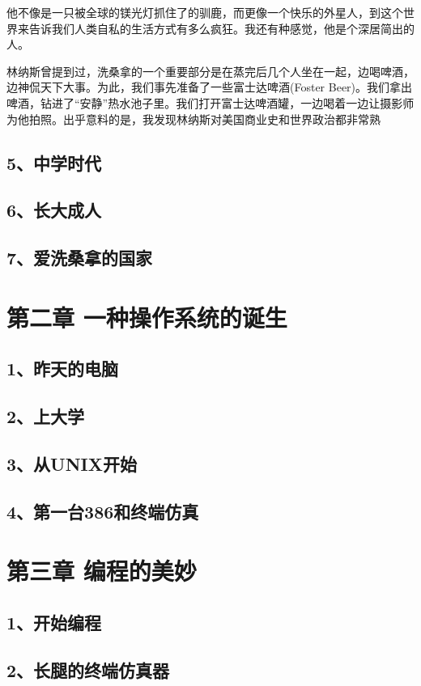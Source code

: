 \documentclass[12pt,UTF8]{ctexbook}
\begin{document}
他不像是一只被全球的镁光灯抓住了的驯鹿，而更像一个快乐的外星人，到这个世界来告诉我们人类自私的生活方式有多么疯狂。我还有种感觉，他是个深居简出的人。

林纳斯曾提到过，洗桑拿的一个重要部分是在蒸完后几个人坐在一起，边喝啤酒，边神侃天下大事。为此，我们事先准备了一些富士达啤酒(Foster Beer)。我们拿出啤酒，钻进了“安静”热水池子里。我们打开富士达啤酒罐，一边喝着一边让摄影师为他拍照。出乎意料的是，我发现林纳斯对美国商业史和世界政治都非常熟

\section{5、中学时代}
\section{6、长大成人}
\section{7、爱洗桑拿的国家}

\chapter{第二章 一种操作系统的诞生}

\section{1、昨天的电脑}
\section{2、上大学}
\section{3、从UNIX开始}
\section{4、第一台386和终端仿真}


\chapter{第三章 编程的美妙}

\section{1、开始编程}
\section{2、长腿的终端仿真器}
\end{document}
